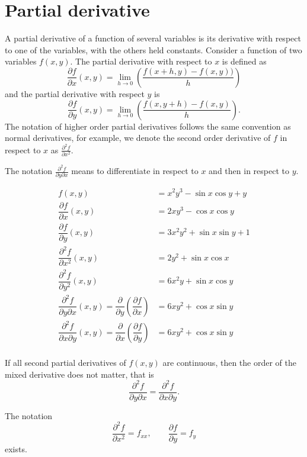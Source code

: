 \section{Partial derivative}

\begin{definition}
    A partial derivative of a function of several variables is its derivative with respect to one of the variables, with the others held constants.
    Consider a function of two variables $f(x,y)$. The partial derivative with respect to $x$ is defined as \[\dfrac{\partial f}{\partial x}(x,y)=\lim_{h\to0}\left(\dfrac{f(x+h,y)-f(x,y))}{h}\right)\] and the partial derivative with respect $y$ is \[\dfrac{\partial f}{\partial y}(x,y)=\lim_{h\to0}\left(\dfrac{f(x,y+h)-f(x,y)}{h}\right).\] The notation of higher order partial derivatives follows the same convention as normal derivatives, for example, we denote the second order derivative of $f$ in respect to $x$ as $\frac{\partial^2f}{\partial x^2}$. 
    
    The notation $\frac{\partial^2f}{\partial y\partial x}$ means to differentiate in respect to $x$ and then in respect to $y$.
\end{definition}

\begin{example}
    \begin{align*}
        f(x,y)&=x^2y^3-\sin{x}\cos{y}+y\\
        \dfrac{\partial f}{\partial x}(x,y)&=2xy^3-\cos{x}\cos{y}\\
        \dfrac{\partial f}{\partial y}(x,y)&=3x^2y^2+\sin{x}\sin{y}+1\\
        \dfrac{\partial^2 f}{\partial x^2}(x,y)&=2y^2+\sin{x}\cos{x}\\
        \dfrac{\partial^2 f}{\partial y^2}(x,y)&=6x^2y+\sin{x}\cos{y}\\
        \dfrac{\partial^2 f}{\partial y\partial x}(x,y)=\dfrac{\partial}{\partial y}\left(\dfrac{\partial f}{\partial x}\right)&=6xy^2+\cos{x}\sin{y}\\
        \dfrac{\partial^2 f}{\partial x\partial y}(x,y)=\dfrac{\partial}{\partial x}\left(\dfrac{\partial f}{\partial y}\right)&=6xy^2+\cos{x}\sin{y}\\
    \end{align*}
\end{example}

\begin{remark}
    If all second partial derivatives of $f(x,y)$ are continuous, then the order of the mixed derivative does not matter, that is \[\dfrac{\partial^2 f}{\partial y\partial x}=\dfrac{\partial^2 f}{\partial x\partial y}.\]
    \label{remark:equality_mixed_partials}
\end{remark}

\begin{remark}
    The notation \[\dfrac{\partial^2 f}{\partial x^2}=f_{xx},\qquad \dfrac{\partial f}{\partial y}=f_{y}\] exists.
\end{remark}
